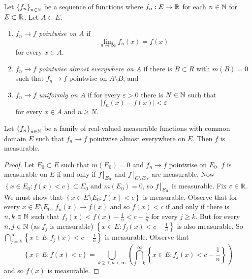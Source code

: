 \begin{definition}
	Let
	$
		\left\{
			f_n
		\right\}_{n \in \mathbb{N}}
	$
	be a sequence of functions where $f_n: E \to \mathbb{R}$ for each $n \in \mathbb{N}$
	for $E \subset \mathbb{R}$.
	Let $A \subset E$.
	\begin{enumerate}
		\item \emph{$f_n \to f$ pointwise on $A$} if
			\[
				\lim_{n \to \infty} f_n(x) = f(x)
			\]
			for every $x \in A$.

		\item \emph{$f_n \to f$ pointwise almost everywhere on $A$}
			if there is $B \subset R$ with $m(B) = 0$ such that
			$f_n \to f$ pointwise on $A \setminus B$; and

		\item \emph{$f_n \to f$ uniformly on $A$} if
			for every $\varepsilon > 0$ there is $N \in \mathbb{N}$
			such that
			\[
				\left\lvert f_n(x) - f(x) \right\rvert < \varepsilon
			\]
			for every $x \in A$ and $n \geq N$.
	\end{enumerate}
\end{definition}

\begin{proposition}[]
	Let
	$
		\left\{
			f_n
		\right\}_{n \in \mathbb{N}}
	$
	be a family of real-valued measurable functions with common domain $E$
	such that $f_n \to f$ pointwise almost everywhere on $E$.
	Then $f$ is measurable.
\end{proposition}

\begin{proof}
	Let $E_0 \subset E$ such that $m(E_0) = 0$
	and $f_n \to f$ pointwise on $E_0$.
	$f$ is measurable on $E$ if and only if
	$\restr f{E_0}$ and $\restr f{E \setminus E_0}$
	are measurable.
	Now $\left\{
		x \in E_0: f(x) < c
	\right\} \subset E_0$
	and $m(E_0) = 0$, so $\restr f{E_0}$ is measurable.
	Fix $c \in \mathbb{R}$. We must show that
	$
		\left\{
			x \in E \setminus E_0: f(x) < c
		\right\}
	$
	is measurable.
	Observe that for every $x \in E \setminus E_0$,
	$f_n(x) \to f(x)$ and so $f(x) < c$ if and only if there is
	$n, k \in \mathbb{N}$ such that $f_j(x) < f(x) - \frac1n < c - \frac1n$
	for every $j \geq k$.
	But for every $n, j \in \mathbb{N}$ (as $f_j$ is measurable)
	$
		\left\{
			x \in E: f_j(x) < c - \frac1n
		\right\}
	$
	is also measurable.
	So
	$
		\bigcap_{j=k}^\infty
		\left\{
			x \in E: f_j(x) < c - \frac1n
		\right\}
	$
	is measurable.
	Observe that
	\[
		\left\{
			x \in E: f(x) < c
		\right\}
		= \bigcup_{k \geq 1, n < \infty}
		\left( 
			\bigcap_{j=k}^\infty
			\left\{
				x \in E: f_j(x) < c - \frac1n
			\right\}
		\right)
	\]
	and so $f(x)$ is measurable.
\end{proof}

